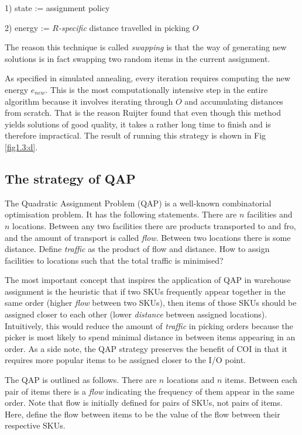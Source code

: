 \documentclass[hyp]{socreport}
\begin{document}
1) state := assignment policy

2) energy := \textit{$R$-specific} distance travelled in picking $O$

The reason this technique is called \textit{swapping} is that the way of generating new solutions is in fact swapping two random items in the current assignment.

As specified in simulated annealing, every iteration requires computing the new energy $e_{new}$. This is the most computationally intensive step in the entire algorithm because it involves iterating through $O$ and accumulating distances from scratch. That is the reason Ruijter found that even though this method yields solutions of good quality, it takes a rather long time to finish and is therefore impractical. The result of running this strategy is shown in Fig \ref{fig1.3:d}.

\subsection{The strategy of QAP}
\label{sec:qap}
The Quadratic Assignment Problem (QAP) is a well-known combinatorial optimisation problem. It has the following statements. There are $n$ facilities and $n$ locations. Between any two facilities there are products transported to and fro, and the amount of transport is called \textit{flow}. Between two locations there is some distance. Define \textit{traffic} as the product of flow and distance. How to assign facilities to locations such that the total traffic is minimised?

The most important concept that inspires the application of QAP in warehouse assignment is the heuristic that if two SKUs frequently appear together in the same order (higher \textit{flow} between two SKUs), then items of those SKUs should be assigned closer to each other (lower \textit{distance} between assigned locations). Intuitively, this would reduce the amount of \textit{traffic} in picking orders because the picker is most likely to spend minimal distance in between items appearing in an order. As a side note, the QAP strategy preserves the benefit of COI in that it requires more popular items to be assigned closer to the I/O point.

The QAP is outlined as follows. There are $n$ locations and $n$ items. Between each pair of items there is a \textit{flow} indicating the frequency of them appear in the same order. Note that flow is initially defined for pairs of SKUs, not pairs of items. Here, define the flow between items to be the value of the flow between their respective SKUs.
\end{document}
